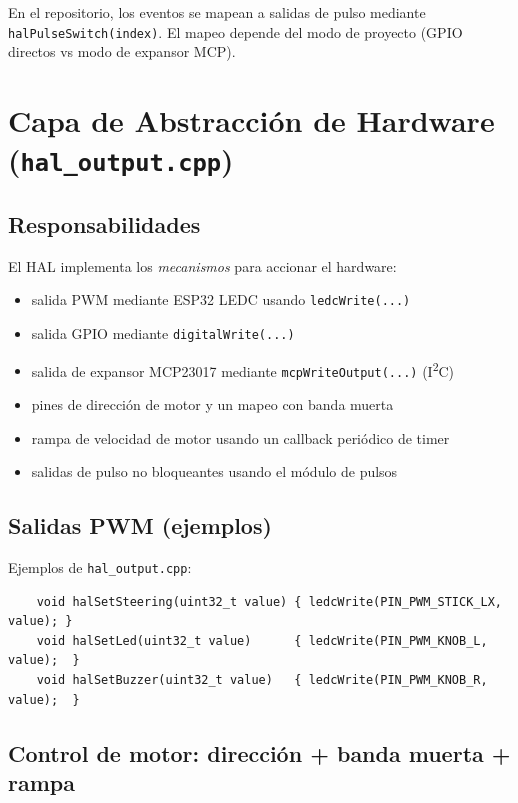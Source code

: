 En el repositorio, los eventos se mapean a salidas de pulso mediante \texttt{halPulseSwitch(index)}. El mapeo depende del
modo de proyecto (GPIO directos vs modo de expansor MCP).

\section{Capa de Abstracción de Hardware (\texttt{hal\_output.cpp})}
\label{sec:control-hal-hal-layer}

\subsection{Responsabilidades}
\label{subsec:control-hal-hal-resp}

El HAL implementa los \emph{mecanismos} para accionar el hardware:

\begin{itemize}
    \item salida PWM mediante ESP32 LEDC usando \texttt{ledcWrite(...)}
    \item salida GPIO mediante \texttt{digitalWrite(...)}
    \item salida de expansor MCP23017 mediante \texttt{mcpWriteOutput(...)} (I\textsuperscript{2}C)
    \item pines de dirección de motor y un mapeo con banda muerta
    \item rampa de velocidad de motor usando un callback periódico de timer
    \item salidas de pulso no bloqueantes usando el módulo de pulsos
\end{itemize}

\subsection{Salidas PWM (ejemplos)}
\label{subsec:control-hal-hal-pwm}

Ejemplos de \texttt{hal\_output.cpp}:

\begin{verbatim}
    void halSetSteering(uint32_t value) { ledcWrite(PIN_PWM_STICK_LX, value); }
    void halSetLed(uint32_t value)      { ledcWrite(PIN_PWM_KNOB_L, value);  }
    void halSetBuzzer(uint32_t value)   { ledcWrite(PIN_PWM_KNOB_R, value);  }
\end{verbatim}

\subsection{Control de motor: dirección + banda muerta + rampa}
\label{subsec:control-hal-hal-motors}

